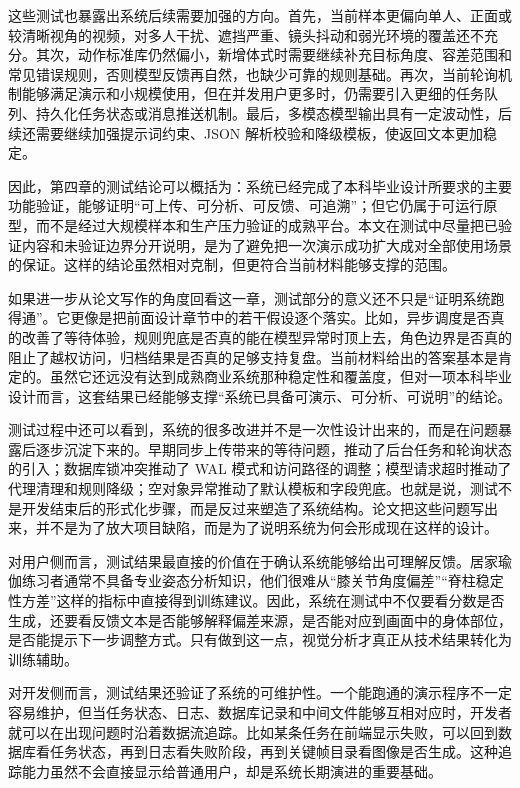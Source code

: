 \documentclass[UTF8,twoside]{ctexrep}
\makeatletter
\def@NAT@last@yr{\@citea}%
\def@NAT@last@yr{-\NAT@penalty}%
\makeatother
\begin{document}
这些测试也暴露出系统后续需要加强的方向。首先，当前样本更偏向单人、正面或较清晰视角的视频，对多人干扰、遮挡严重、镜头抖动和弱光环境的覆盖还不充分。其次，动作标准库仍然偏小，新增体式时需要继续补充目标角度、容差范围和常见错误规则，否则模型反馈再自然，也缺少可靠的规则基础。再次，当前轮询机制能够满足演示和小规模使用，但在并发用户更多时，仍需要引入更细的任务队列、持久化任务状态或消息推送机制。最后，多模态模型输出具有一定波动性，后续还需要继续加强提示词约束、JSON 解析校验和降级模板，使返回文本更加稳定。

因此，第四章的测试结论可以概括为：系统已经完成了本科毕业设计所要求的主要功能验证，能够证明“可上传、可分析、可反馈、可追溯”；但它仍属于可运行原型，而不是经过大规模样本和生产压力验证的成熟平台。本文在测试中尽量把已验证内容和未验证边界分开说明，是为了避免把一次演示成功扩大成对全部使用场景的保证。这样的结论虽然相对克制，但更符合当前材料能够支撑的范围。

如果进一步从论文写作的角度回看这一章，测试部分的意义还不只是“证明系统跑得通”。它更像是把前面设计章节中的若干假设逐个落实。比如，异步调度是否真的改善了等待体验，规则兜底是否真的能在模型异常时顶上去，角色边界是否真的阻止了越权访问，归档结果是否真的足够支持复盘。当前材料给出的答案基本是肯定的。虽然它还远没有达到成熟商业系统那种稳定性和覆盖度，但对一项本科毕业设计而言，这套结果已经能够支撑“系统已具备可演示、可分析、可说明”的结论。

测试过程中还可以看到，系统的很多改进并不是一次性设计出来的，而是在问题暴露后逐步沉淀下来的。早期同步上传带来的等待问题，推动了后台任务和轮询状态的引入；数据库锁冲突推动了 WAL 模式和访问路径的调整；模型请求超时推动了代理清理和规则降级；空对象异常推动了默认模板和字段兜底。也就是说，测试不是开发结束后的形式化步骤，而是反过来塑造了系统结构。论文把这些问题写出来，并不是为了放大项目缺陷，而是为了说明系统为何会形成现在这样的设计。

对用户侧而言，测试结果最直接的价值在于确认系统能够给出可理解反馈。居家瑜伽练习者通常不具备专业姿态分析知识，他们很难从“膝关节角度偏差”“脊柱稳定性方差”这样的指标中直接得到训练建议。因此，系统在测试中不仅要看分数是否生成，还要看反馈文本是否能够解释偏差来源，是否能对应到画面中的身体部位，是否能提示下一步调整方式。只有做到这一点，视觉分析才真正从技术结果转化为训练辅助。

对开发侧而言，测试结果还验证了系统的可维护性。一个能跑通的演示程序不一定容易维护，但当任务状态、日志、数据库记录和中间文件能够互相对应时，开发者就可以在出现问题时沿着数据流追踪。比如某条任务在前端显示失败，可以回到数据库看任务状态，再到日志看失败阶段，再到关键帧目录看图像是否生成。这种追踪能力虽然不会直接显示给普通用户，却是系统长期演进的重要基础。
\end{document}
